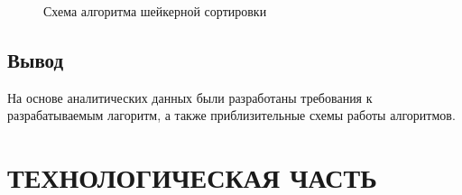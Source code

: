 \documentclass[a4paper,12pt]{article}
\begin{document}
\begin{figure}[p]
\caption{Схема алгоритма шейкерной сортировки}
\label{images:scheme3}
\end{figure}

\newpage
\subsection{Вывод}
На основе аналитических данных были разработаны требования к разрабатываемым лагоритм, а также приблизительные схемы работы алгоритмов.


\newpage
\section{ТЕХНОЛОГИЧЕСКАЯ ЧАСТЬ}
\end{document}
